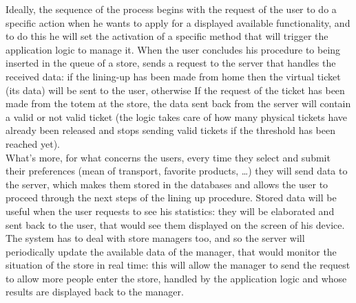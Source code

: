 \documentclass[]{article}
\begin{document}
\begin{paragraph}
					
					Ideally, the sequence of the process begins with the request of the user to do a specific action when he wants to apply for a displayed available functionality, and to do this he will set the activation of a specific method that will trigger the application logic to manage it.
When the user concludes his procedure to being inserted in the queue of a store, sends a request to the server that handles the received data: if the lining-up has been made from home then the virtual ticket (its data) will be sent to the user, otherwise If the request of the ticket has been made from the totem at the store, the data sent back from the server will contain a valid or not valid ticket (the logic takes care of how many physical tickets have already been released and stops  sending valid tickets if the threshold has been reached yet).\\
					\newline
What’s more, for what concerns the users, every time they select and submit their preferences (mean of transport, favorite products, …) they will send data to the server, which makes them stored in the databases and allows the user to proceed through the next steps of the lining up procedure. Stored data will be useful when the user requests to see his statistics: they will be elaborated and sent back to the user, that would see them displayed on the screen of his device.\\
					\newline
The system has to deal with store managers too, and so the server will periodically update the available data of the manager, that would monitor the situation of the store in real time: this will allow the manager to send the request to allow more people enter the store, handled by the application logic and whose results are displayed back to the manager. \newline


\end{paragraph}
\end{document}
